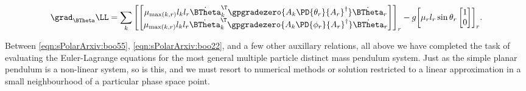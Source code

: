 \begin{align}\label{eqn:sPolarArxiv:boo55}
\grad_{\BTheta} \LL =
\sum_k
{\begin{bmatrix}
\begin{bmatrix}
\mu_{\max(k,r)} l_k l_r {\dot{\BTheta}_k}^\T \gpgradezero{ A_k \PD{\theta_r}{A_r}^\dagger } \dot{\BTheta}_r \\
\mu_{\max(k,r)} l_k l_r {\dot{\BTheta}_k}^\T \gpgradezero{ A_k \PD{\phi_r}{A_r}^\dagger } \dot{\BTheta}_r 
\end{bmatrix}
\end{bmatrix}}_r
- g
{\begin{bmatrix}
\mu_r l_r \sin\theta_r 
\begin{bmatrix}
1 \\
0
\end{bmatrix}
\end{bmatrix}}_r.
\end{align}

Between \ref{eqn:sPolarArxiv:boo55}, \ref{eqn:sPolarArxiv:boo22}, and a few other auxillary relations, all above we have completed the task of evaluating the Euler-Lagrange equations for the most general multiple particle distinct mass pendulum system.  Just as the simple planar pendulum is a non-linear system, so is this, and we must resort to numerical methods or solution restricted to a linear approximation in a small neighbourhood of a particular phase space point.

\EndArticle
